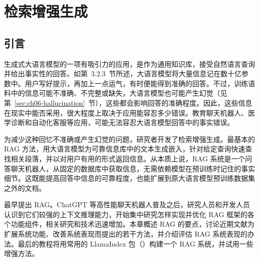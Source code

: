 \chapter{检索增强生成}
\label{ch:rag}

\section{引言}
生成式大语言模型的一项有吸引力的应用，是作为通用知识库，接受自然语言查询并给出事实性的回答。如第~3.2.3~节所述，大语言模型将大量信息记在数十亿参数中。用户写好提示，再加上一点运气，有时便能得到准确的回答。不过，训练语料中的信息可能不准确、不完整或缺失，大语言模型也可能产生幻觉（见第~\ref{sec:ch06-hallucination}~节），这些都会影响回答的准确程度。因此，这些信息在现实中能否采用，很大程度上取决于应用能容忍多少错误。教育聊天机器人、医学诊断和自动化客服等应用，可能无法容忍大语言模型回答中的事实错误。

为减少这种回忆不准确或产生幻觉的问题，研究者开发了检索增强生成。最基本的 RAG 方法，用大语言模型为可靠信息库中的文本生成嵌入，针对给定查询快速查找相关段落，并以对用户有用的形式返回信息。从本质上说，RAG 系统是一个问答聊天机器人，从固定的数据库中获取信息，无需依赖模型在预训练时记住的事实细节。这既能提高回答中信息的可靠程度，也能扩展到原大语言模型预训练数据集之外的文档。

最早提出 RAG。ChatGPT 等高性能聊天机器人普及之后，研究人员和开发人员认识到它们较强的上下文推理能力，开始集中研究怎样实现并优化 RAG 框架的各个功能组件，相关研究和技术迅速增加。本章概述 RAG 的要点，讨论近期文献为扩展系统功能、改善系统表现而提出的若干方法，并介绍评估 RAG 系统表现的办法。最后的教程将用常用的 LlamaIndex 包（）构建一个 RAG 系统，并试用一些增强方法。

